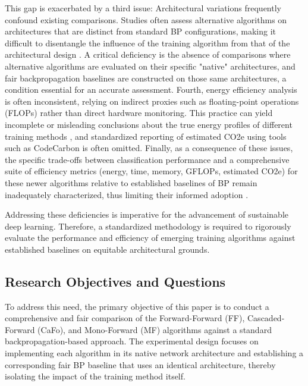 This gap is exacerbated by a third issue: Architectural variations frequently confound existing comparisons. Studies often assess alternative algorithms on architectures that are distinct from standard BP configurations, making it difficult to disentangle the influence of the training algorithm from that of the architectural design \cite{desislavov2024energy, yarally2023uncovering}. A critical deficiency is the absence of comparisons where alternative algorithms are evaluated on their specific "native" architectures, and fair backpropagation baselines are constructed on those same architectures, a condition essential for an accurate assessment. Fourth, energy efficiency analysis is often inconsistent, relying on indirect proxies such as floating-point operations (FLOPs) rather than direct hardware monitoring. This practice can yield incomplete or misleading conclusions about the true energy profiles of different training methods \cite{rajput2023enhancing, charpentier2023accuracy, chung2024zeus}, and standardized reporting of estimated CO2e using tools such as CodeCarbon is often omitted. Finally, as a consequence of these issues, the specific trade-offs between classification performance and a comprehensive suite of efficiency metrics (energy, time, memory, GFLOPs, estimated CO2e) for these newer algorithms relative to established baselines of BP remain inadequately characterized, thus limiting their informed adoption \cite{yarally2023uncovering, narayanagowda2023watt}.

Addressing these deficiencies is imperative for the advancement of sustainable deep learning. Therefore, a standardized methodology is required to rigorously evaluate the performance and efficiency of emerging training algorithms against established baselines on equitable architectural grounds.

\subsection{Research Objectives and Questions}
\label{sec:objectives}

To address this need, the primary objective of this paper is to conduct a comprehensive and fair comparison of the Forward-Forward (FF), Cascaded-Forward (CaFo), and Mono-Forward (MF) algorithms against a standard backpropagation-based approach. The experimental design focuses on implementing each algorithm in its native network architecture and establishing a corresponding fair BP baseline that uses an identical architecture, thereby isolating the impact of the training method itself.

